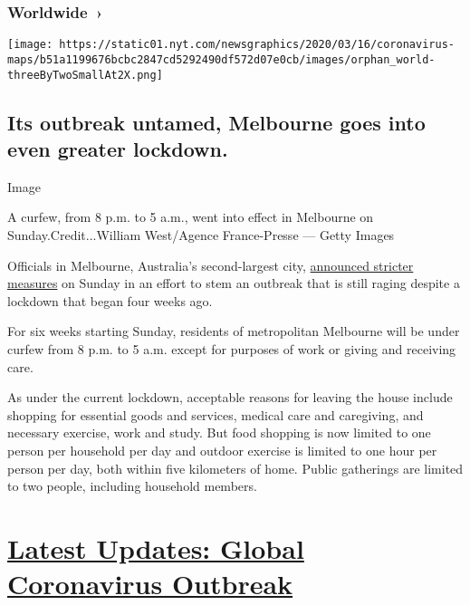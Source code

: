 \href{https://www.nytimes.com/interactive/2020/world/coronavirus-maps.html}{}

\hypertarget{worldwide-}{%
\subsubsection{Worldwide~›}\label{worldwide-}}

\texttt{[image: https://static01.nyt.com/newsgraphics/2020/03/16/coronavirus-maps/b51a1199676bcbc2847cd5292490df572d07e0cb/images/orphan\_world-threeByTwoSmallAt2X.png]}

\hypertarget{its-outbreak-untamed-melbourne-goes-into-even-greater-lockdown}{%
\subsection{Its outbreak untamed, Melbourne goes into even greater
lockdown.}\label{its-outbreak-untamed-melbourne-goes-into-even-greater-lockdown}}

Image

A curfew, from 8 p.m. to 5 a.m., went into effect in Melbourne on
Sunday.Credit...William West/Agence France-Presse --- Getty Images

Officials in Melbourne, Australia's second-largest city,
\href{https://www.premier.vic.gov.au/statement-changes-melbournes-restrictions}{announced
stricter measures} on Sunday in an effort to stem an outbreak that is
still raging despite a lockdown that began four weeks ago.

For six weeks starting Sunday, residents of metropolitan Melbourne will
be under curfew from 8 p.m. to 5 a.m. except for purposes of work or
giving and receiving care.

As under the current lockdown, acceptable reasons for leaving the house
include shopping for essential goods and services, medical care and
caregiving, and necessary exercise, work and study. But food shopping is
now limited to one person per household per day and outdoor exercise is
limited to one hour per person per day, both within five kilometers of
home. Public gatherings are limited to two people, including household
members.

\hypertarget{latest-updates-global-coronavirus-outbreak}{%
\section{\texorpdfstring{\href{https://www.nytimes.com/2020/08/03/world/coronavirus-covid-19.html?action=click\&pgtype=Article\&state=default\&region=MAIN_CONTENT_1\&context=storylines_live_updates}{Latest
Updates: Global Coronavirus
Outbreak}}{Latest Updates: Global Coronavirus Outbreak}}\label{latest-updates-global-coronavirus-outbreak}}


